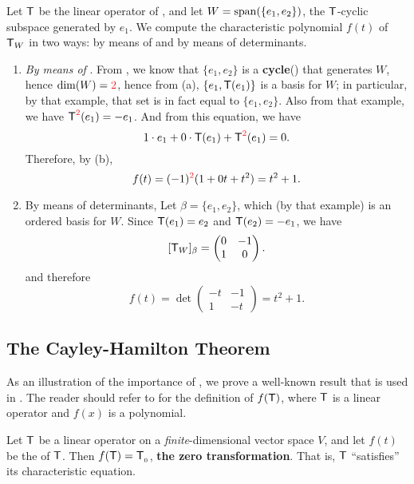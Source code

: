 \begin{example} \label{example 5.4.6}
Let \(\textsf{T}\) be the linear operator of , and let \(W = \operatorname{span}(\{ e_1, e_2 \})\), the \(\textsf{T}\)-cyclic subspace generated by \(e_1\).
We compute the characteristic polynomial \(f(t)\) of \(\textsf{T}_W\) in two ways: by means of  and by means of determinants.
\begin{enumerate}
\item \emph{By means of }.
From , we know that \(\{ e_1, e_2\}\) is a \textbf{cycle}() that generates \(W\), hence \(\dim(W) = \RED{2}\), hence from (a), \(\{ e_1, \textsf{T}(e_1) \}\) is a basis for \(W\);
in particular, by that example, that set is in fact equal to \(\{ e_1, e_2 \}\).
Also from that example, we have \(\T^{\RED{2}}(e_1) = -e_1\).
And from this equation, we have
\[
    1 \cdot e_1 + 0 \cdot \T(e_1) + \T^{\RED{2}}(e_1) = 0.
\]
Therefore, by (b),
\[
    f(t) = (-1)^{\RED{2}} (1 + 0t + t^2) = t^2 + 1.
\]

\item By means of determinants, Let \(\beta = \{ e_1, e_2 \}\), which (by that example) is an ordered basis for \(W\).
Since \(\textsf{T}(e_1) = e_2\) and \(\textsf{T}(e_2) = -e_1\), we have
\[
    [\textsf{T}_W]_{\beta} = \begin{pmatrix} 0 & -1 \\ 1 & 0 \end{pmatrix}.
\]
and therefore
\[
    f(t) = \det \begin{pmatrix} -t & -1 \\ 1 & -t \end{pmatrix} = t^2 + 1.
\]
\end{enumerate}
\end{example}

\subsection{The Cayley-Hamilton Theorem} \label{sec 5.4.1}
As an illustration of the importance of , we prove a well-known result that is used in .
The reader should refer to  for the definition of \(f(\textsf{T})\), where \(\textsf{T}\) is a linear operator and \(f(x)\) is a polynomial.

\begin{theorem}  \label{thm 5.22}
Let \(\textsf{T}\) be a linear operator on a \emph{finite}-dimensional vector space \(V\), and let \(f(t)\) be the \CPOLY{} of \(\textsf{T}\).
Then \(f(\textsf{T}) = \textsf{T}_{_0}\), \textbf{the zero transformation}.
That is, \(\textsf{T}\) ``satisfies'' its characteristic equation.
\end{theorem}

